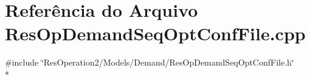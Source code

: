 \section{Referência do Arquivo Res\+Op\+Demand\+Seq\+Opt\+Conf\+File.\+cpp}
\label{_res_op_demand_seq_opt_conf_file_8cpp}
{\ttfamily \#include \char`\"{}Res\+Operation2/\+Models/\+Demand/\+Res\+Op\+Demand\+Seq\+Opt\+Conf\+File.\+h\char`\"{}}\\*
